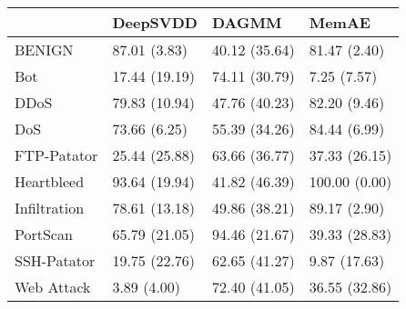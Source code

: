 \begin{tabular}{llll}
\toprule
{} &       DeepSVDD &          DAGMM &          MemAE \\
\midrule
BENIGN       &   87.01 (3.83) &  40.12 (35.64) &   81.47 (2.40) \\
Bot          &  17.44 (19.19) &  74.11 (30.79) &    7.25 (7.57) \\
DDoS         &  79.83 (10.94) &  47.76 (40.23) &   82.20 (9.46) \\
DoS          &   73.66 (6.25) &  55.39 (34.26) &   84.44 (6.99) \\
FTP-Patator  &  25.44 (25.88) &  63.66 (36.77) &  37.33 (26.15) \\
Heartbleed   &  93.64 (19.94) &  41.82 (46.39) &  100.00 (0.00) \\
Infiltration &  78.61 (13.18) &  49.86 (38.21) &   89.17 (2.90) \\
PortScan     &  65.79 (21.05) &  94.46 (21.67) &  39.33 (28.83) \\
SSH-Patator  &  19.75 (22.76) &  62.65 (41.27) &   9.87 (17.63) \\
Web Attack   &    3.89 (4.00) &  72.40 (41.05) &  36.55 (32.86) \\
\bottomrule
\end{tabular}
